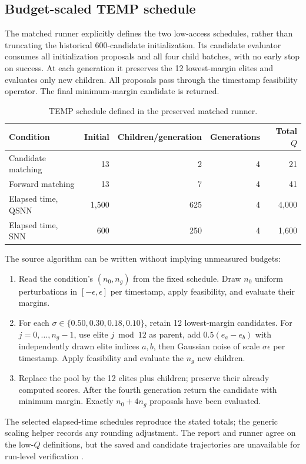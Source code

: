 \subsection{Budget-scaled TEMP schedule}
The matched runner explicitly defines the two low-access schedules, rather than truncating the historical 600-candidate initialization. Its candidate evaluator consumes all initialization proposals and all four child batches, with no early stop on success. At each generation it preserves the 12 lowest-margin elites and evaluates only new children. All proposals pass through the timestamp feasibility operator. The final minimum-margin candidate is returned.
\begin{table}[H]\centering\small
\caption{TEMP schedule defined in the preserved matched runner.}
\label{tab:temp_schedule}
\begin{tabularx}{\linewidth}{L R R R R}\toprule
Condition & Initial & Children/generation & Generations & Total $Q$\\\midrule
Candidate matching & 13 & 2 & 4 & 21\\
Forward matching & 13 & 7 & 4 & 41\\
Elapsed time, QSNN & 1,500 & 625 & 4 & 4,000\\
Elapsed time, SNN & 600 & 250 & 4 & 1,600\\\bottomrule
\end{tabularx}
\end{table}
\noindent The source algorithm can be written without implying unmeasured budgets:
\begin{enumerate}
\item Read the condition's $(n_0,n_g)$ from the fixed schedule. Draw $n_0$ uniform perturbations in $[-\epsilon,\epsilon]$ per timestamp, apply feasibility, and evaluate their margins.
\item For each $\sigma\in\{0.50,0.30,0.18,0.10\}$, retain 12 lowest-margin candidates. For $j=0,\ldots,n_g-1$, use elite $j\bmod12$ as parent, add $0.5(e_a-e_b)$ with independently drawn elite indices $a,b$, then Gaussian noise of scale $\sigma\epsilon$ per timestamp. Apply feasibility and evaluate the $n_g$ new children.
\item Replace the pool by the 12 elites plus children; preserve their already computed scores. After the fourth generation return the candidate with minimum margin. Exactly $n_0+4n_g$ proposals have been evaluated.
\end{enumerate}
The selected elapsed-time schedules reproduce the stated totals; the generic scaling helper records any rounding adjustment. The report and runner agree on the low-$Q$ definitions, but the saved  and candidate trajectories are unavailable for run-level verification .

